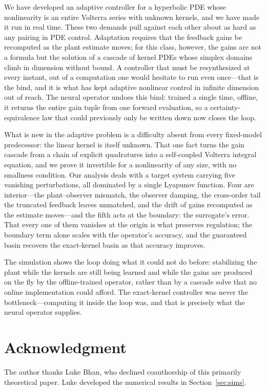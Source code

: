 \documentclass[journal,twoside,web]{ieeecolor}
\begin{document}
We have developed an adaptive controller for a hyperbolic PDE whose nonlinearity is an entire Volterra series with unknown kernels, and we have made it run in real time. These two demands pull against each other about as hard as any pairing in PDE control. Adaptation requires that the feedback gains be recomputed as the plant estimate moves; for this class, however, the gains are not a formula but the solution of a cascade of kernel PDEs whose simplex domains climb in dimension without bound. A controller that must be resynthesized at every instant, out of a computation one would hesitate to run even once---that is the bind, and it is what has kept adaptive nonlinear control in infinite dimension out of reach. The neural operator undoes this bind: trained a single time, offline, it returns the entire gain tuple from one forward evaluation, so a certainty-equivalence law that could previously only be written down now closes the loop.

What is new in the adaptive problem is a difficulty absent from every fixed-model predecessor: the linear kernel is itself unknown. That one fact turns the gain cascade from a chain of explicit quadratures into a self-coupled Volterra integral equation, and we prove it invertible for a nonlinearity of any size, with no smallness condition. Our analysis deals with a target system carrying five vanishing perturbations, all dominated by a single Lyapunov function. Four are interior---the plant--observer mismatch, the observer damping, the cross-order tail the truncated feedback leaves unmatched, and the drift of gains recomputed as the estimate moves---and the fifth acts at the boundary: the surrogate's error. That every one of them vanishes at the origin is what preserves regulation; the boundary term alone scales with the operator's accuracy, and the guaranteed basin recovers the exact-kernel basin as that accuracy improves.

The simulation shows the loop doing what it could not do before: stabilizing the plant while the kernels are still being learned and while the gains are produced on the fly by the offline-trained operator, rather than by a cascade solve that no online implementation could afford. The exact-kernel controller was never the bottleneck---computing it inside the loop was, and that is precisely what the neural operator supplies.

\section*{Acknowledgment}
The author thanks Luke Bhan, who declined coauthorship of this primarily theoretical paper. Luke developed the numerical results in Section~\ref{sec:sims}.
\end{document}
